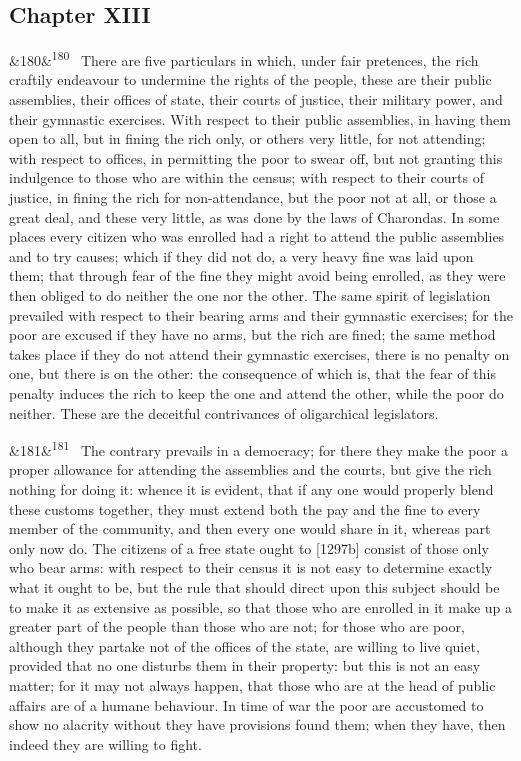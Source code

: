 \documentclass[12pt]{article}
\newcommand{\para}[1][]{\par\noindent\ifx&#1&\else\textsuperscript{\footnotesize #1}~\fi}
\begin{document}
\subsection*{Chapter XIII}

\para[180] There are five particulars in which, under fair pretences, the rich craftily endeavour to undermine the rights of the people, these are their public assemblies, their offices of state, their courts of justice, their military power, and their gymnastic exercises. With respect to their public assemblies, in having them open to all, but in fining the rich only, or others very little, for not attending; with respect to offices, in permitting the poor to swear off, but not granting this indulgence to those who are within the census; with respect to their courts of justice, in fining the rich for non-attendance, but the poor not at all, or those a great deal, and these very little, as was done by the laws of Charondas. In some places every citizen who was enrolled had a right to attend the public assemblies and to try causes; which if they did not do, a very heavy fine was laid upon them; that through fear of the fine they might avoid being enrolled, as they were then obliged to do neither the one nor the other. The same spirit of legislation prevailed with respect to their bearing arms and their gymnastic exercises; for the poor are excused if they have no arms, but the rich are fined; the same method takes place if they do not attend their gymnastic exercises, there is no penalty on one, but there is on the other: the consequence of which is, that the fear of this penalty induces the rich to keep the one and attend the other, while the poor do neither. These are the deceitful contrivances of oligarchical legislators.

\para[181] The contrary prevails in a democracy; for there they make the poor a proper allowance for attending the assemblies and the courts, but give the rich nothing for doing it: whence it is evident, that if any one would properly blend these customs together, they must extend both the pay and the fine to every member of the community, and then every one would share in it, whereas part only now do. The citizens of a free state ought to [1297b] consist of those only who bear arms: with respect to their census it is not easy to determine exactly what it ought to be, but the rule that should direct upon this subject should be to make it as extensive as possible, so that those who are enrolled in it make up a greater part of the people than those who are not; for those who are poor, although they partake not of the offices of the state, are willing to live quiet, provided that no one disturbs them in their property: but this is not an easy matter; for it may not always happen, that those who are at the head of public affairs are of a humane behaviour. In time of war the poor are accustomed to show no alacrity without they have provisions found them; when they have, then indeed they are willing to fight.
\end{document}
